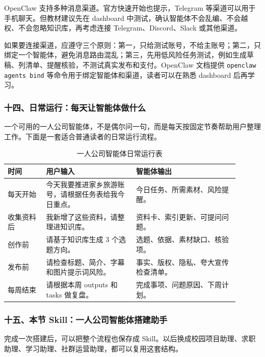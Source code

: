 OpenClaw 支持多种消息渠道。官方快速开始也提示，Telegram 等渠道可以用于手机聊天。但教材建议先在 dashboard 中测试，确认智能体不会乱编、不会越权、不会忽略知识库，再考虑连接 Telegram、Discord、Slack 或其他渠道。

如果要连接渠道，应遵守三个原则：第一，只给测试账号，不给主账号；第二，只绑定一个智能体，避免消息路由混乱；第三，先用低风险任务测试，例如生成草稿、列清单、提醒核验，不测试真实发布和支付。OpenClaw 文档提供 \texttt{openclaw agents bind} 等命令用于绑定智能体和渠道，读者可以在熟悉 dashboard 后再学习。

\subsubsection*{十四、日常运行：每天让智能体做什么}

一个可用的一人公司智能体，不是偶尔问一句，而是每天按固定节奏帮助用户整理工作。下面是一套适合普通读者的日常运行流程。

\begin{table}[H]
\centering
\caption{一人公司智能体日常运行表}
\label{tab:agent-daily-routine}
\begin{tabular}{p{0.15\linewidth} p{0.35\linewidth} p{0.40\linewidth}}
\toprule
\textbf{时间} & \textbf{用户输入} & \textbf{智能体输出} \\
\midrule
每天开始 & 今天我要推进家乡旅游账号，请根据任务表给我今日重点。 & 今日任务、所需素材、风险提醒。 \\
收集资料后 & 我新增了这些资料，请整理进知识库。 & 资料卡、索引更新、可提问问题。 \\
创作前 & 请基于知识库生成 3 个选题方向。 & 选题、依据、素材缺口、核验项。 \\
发布前 & 请检查标题、简介、字幕和图片提示词风险。 & 事实、版权、隐私、夸大宣传检查清单。 \\
每周结束 & 请根据本周 outputs 和 tasks 做复盘。 & 完成事项、问题原因、下周计划。 \\
\bottomrule
\end{tabular}
\end{table}

\subsubsection*{十五、本节 Skill：一人公司智能体搭建助手}

完成一次搭建后，可以把整个流程也保存成 Skill。以后换成校园项目助理、求职助理、学习助理、社群运营助理，都可以复用这套结构。

